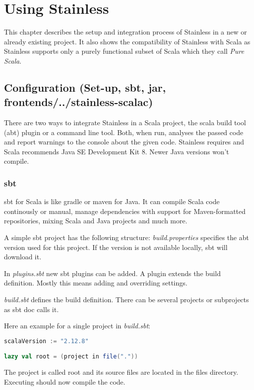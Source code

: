 \chapter{Using Stainless}
\label{chap:using_stainless}
This chapter describes the setup and integration process of Stainless in a new or already existing project.
It also shows the compatibility of Stainless with Scala as Stainless supports only a purely functional subset of Scala which they call \emph{Pure Scala}.

\section{Configuration (Set-up, sbt, jar, frontends/../stainless-scalac)}
There are two ways to integrate Stainless in a Scala project, the scala build tool (abt) plugin or a command line tool.
Both, when run, analyses the passed code and report warnings to the console about the given code.
Stainless requires and Scala recommends Java SE Development Kit 8.
Newer Java versions won't compile.

\subsection{sbt}
sbt for Scala is like gradle or maven for Java.
It can compile Scala code continously or manual, manage dependencies with support for Maven-formatted repositories, mixing Scala and Java projects and much more.

A simple sbt project has the following structure:
\emph{build.properties} specifies the abt version used for this project.
If the version is not available locally, sbt will download it.

In \emph{plugins.sbt} new sbt plugins can be added.
A plugin extends the build definition.
Mostly this means adding and overriding settings.

\emph{build.sbt} defines the build definition.
There can be several projects or subprojects as sbt doc calls it.

Here an example for a single project in \emph{build.sbt}:
\begin{lstlisting}[language=scala]
scalaVersion := "2.12.8"

lazy val root = (project in file("."))
\end{lstlisting}
The project is called root and its source files are located in the files directory.
Executing  should now compile the code.

